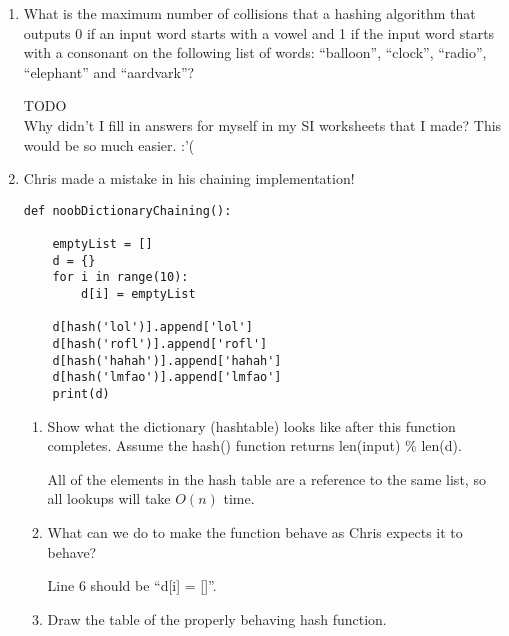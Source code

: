 \documentclass[11pt]{article}
\newenvironment{answer}{\large\lstset{basicstyle=\large}\color{white}}{}
\newenvironment{answer}{\large\lstset{basicstyle=\large}\color{red}}{}
\begin{document}
\begin{enumerate}
\item What is the maximum number of collisions that a hashing algorithm that
      outputs 0 if an input word starts with a vowel and 1 if the input word
      starts with a consonant on the following list of words: ``balloon'',
      ``clock'', ``radio'', ``elephant'' and ``aardvark''?

    \begin{answer}
    \Huge TODO\\
    Why didn't I fill in answers for myself in my SI worksheets that I made?
    This would be so much easier. :'(
    \end{answer}

\item Chris made a mistake in his chaining implementation!

\begin{lstlisting}
def noobDictionaryChaining():

    emptyList = []
    d = {}
    for i in range(10):
        d[i] = emptyList

    d[hash('lol')].append['lol']
    d[hash('rofl')].append['rofl']
    d[hash('hahah')].append['hahah']
    d[hash('lmfao')].append['lmfao']
    print(d)
\end{lstlisting}

    \begin{enumerate}
    \item Show what the dictionary (hashtable) looks like after this function
          completes. Assume the hash() function returns len(input) \% len(d).

        \begin{answer}
        All of the elements in the hash table are a reference to the same list,
        so all lookups will take $O(n)$ time.
        \vspace{2in}
        \end{answer}

    \item What can we do to make the function behave as Chris expects it to
          behave?

        \begin{answer}
        Line 6 should be ``d[i] = []''.
        \end{answer}

    \item Draw the table of the properly behaving hash function.
        
        \begin{answer}
        \vspace{3.5in}
        \end{answer}
    \end{enumerate}



\end{enumerate}
\end{document}
